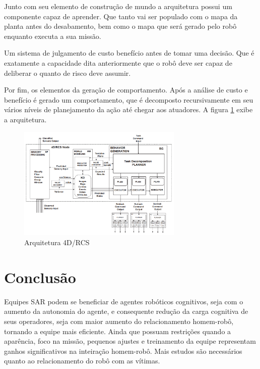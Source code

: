 \documentclass[
	article,			%
	10pt,				%
	oneside,			%
	a4paper,			%
	english,			%
	brazil,				%
	sumario=tradicional	
	]{abntex2}
\begin{document}
Junto com seu elemento de construção de mundo a arquitetura possui um componente capaz de aprender. Que tanto vai ser populado com o mapa da planta antes do desabamento, bem como o mapa que será gerado pelo robô enquanto executa a sua missão. 

Um sistema de julgamento de custo benefício antes de tomar uma decisão. Que é exatamente a capacidade dita anteriormente que o robô deve ser capaz de deliberar o quanto de risco deve assumir. 

Por fim, os elementos da geração de comportamento. Após a análise de custo e benefício é gerado um comportamento, que é decomposto recursivamente em seu vários níveis de planejamento da ação até chegar aos atuadores. A figura \ref{figure:arquitetura} exibe a arquitetura.

\begin{figure}
  \centering
  \includegraphics[width=0.7\textwidth]{4d-rcs.png}
  \caption{Arquitetura 4D/RCS \cite{albus2005rcs}}
  \label{figure:arquitetura}
\end{figure}

\section{Conclusão}

Equipes SAR podem se beneficiar de agentes robóticos cognitivos, seja com o aumento da autonomia do agente, e consequente redução da carga cognitiva de seus operadores, seja com maior aumento do relacionamento homem-robô, tornando a equipe mais eficiente. Ainda que possuam restrições quando a aparência, foco na missão, pequenos ajustes e treinamento da equipe representam ganhos significativos na inteiração homem-robô. Mais estudos são necessários quanto ao relacionamento do robô com as vítimas. 


\postextual



\end{document}
